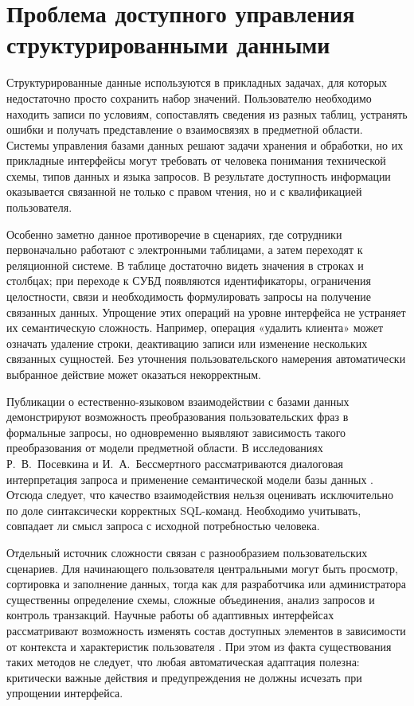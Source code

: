 \clearpage
\section{Проблема доступного управления структурированными данными}

Структурированные данные используются в прикладных задачах, для которых недостаточно просто сохранить набор значений. Пользователю необходимо находить записи по условиям, сопоставлять сведения из разных таблиц, устранять ошибки и получать представление о взаимосвязях в предметной области. Системы управления базами данных решают задачи хранения и обработки, но их прикладные интерфейсы могут требовать от человека понимания технической схемы, типов данных и языка запросов. В результате доступность информации оказывается связанной не только с правом чтения, но и с квалификацией пользователя.

Особенно заметно данное противоречие в сценариях, где сотрудники первоначально работают с электронными таблицами, а затем переходят к реляционной системе. В таблице достаточно видеть значения в строках и столбцах; при переходе к СУБД появляются идентификаторы, ограничения целостности, связи и необходимость формулировать запросы на получение связанных данных. Упрощение этих операций на уровне интерфейса не устраняет их семантическую сложность. Например, операция «удалить клиента» может означать удаление строки, деактивацию записи или изменение нескольких связанных сущностей. Без уточнения пользовательского намерения автоматически выбранное действие может оказаться некорректным.

Публикации о естественно-языковом взаимодействии с базами данных демонстрируют возможность преобразования пользовательских фраз в формальные запросы, но одновременно выявляют зависимость такого преобразования от модели предметной области. В исследованиях Р.~В.~Посевкина и И.~А.~Бессмертного рассматриваются диалоговая интерпретация запроса и применение семантической модели базы данных \cite{posevkin2016,posevkin2018}. Отсюда следует, что качество взаимодействия нельзя оценивать исключительно по доле синтаксически корректных SQL-команд. Необходимо учитывать, совпадает ли смысл запроса с исходной потребностью человека.

Отдельный источник сложности связан с разнообразием пользовательских сценариев. Для начинающего пользователя центральными могут быть просмотр, сортировка и заполнение данных, тогда как для разработчика или администратора существенны определение схемы, сложные объединения, анализ запросов и контроль транзакций. Научные работы об адаптивных интерфейсах рассматривают возможность изменять состав доступных элементов в зависимости от контекста и характеристик пользователя \cite{tagirova2022,abrahao2021}. При этом из факта существования таких методов не следует, что любая автоматическая адаптация полезна: критически важные действия и предупреждения не должны исчезать при упрощении интерфейса.

